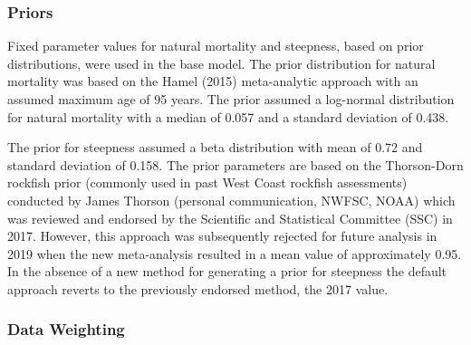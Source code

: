 \documentclass[11pt,
  english,
  letterpaper,
]{article}
\begin{document}
\leavevmode\tagmcend\tagstructend\par


\hypertarget{priors}{%
\subsubsection{Priors}\label{priors}}

\leavevmode\tagmcend\tagstructend


Fixed parameter values for natural mortality and steepness, based on prior distributions, were used in the base model. The prior distribution for natural mortality was based on the Hamel {(2015)\leavevmode\tagmcend\tagstructend} meta-analytic approach with an assumed maximum age of 95 years. The prior assumed a log-normal distribution for natural mortality with a median of 0.057 and a standard deviation of 0.438.

\leavevmode\tagmcend\tagstructend\par


The prior for steepness assumed a beta distribution with mean of 0.72 and standard deviation of 0.158. The prior parameters are based on the Thorson-Dorn rockfish prior (commonly used in past West Coast rockfish assessments) conducted by James Thorson (personal communication, NWFSC, NOAA) which was reviewed and endorsed by the Scientific and Statistical Committee (SSC) in 2017. However, this approach was subsequently rejected for future analysis in 2019 when the new meta-analysis resulted in a mean value of approximately 0.95. In the absence of a new method for generating a prior for steepness the default approach reverts to the previously endorsed method, the 2017 value.

\leavevmode\tagmcend\tagstructend\par


\hypertarget{data-weighting}{%
\subsubsection{Data Weighting}\label{data-weighting}}

\leavevmode\tagmcend\tagstructend
\end{document}
